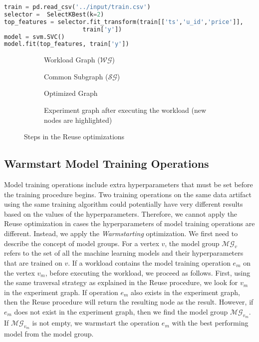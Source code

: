 \begin{lstlisting}[language=Python, firstnumber = 8,caption=New workload script (Imports are omitted),captionpos=b,label = {listing-reuse}]
train = pd.read_csv('../input/train.csv') 
selector =  SelectKBest(k=2)
top_features = selector.fit_transform(train[['ts','u_id','price']], 
				      train['y'])
model = svm.SVC()
model.fit(top_features, train['y'])
\end{lstlisting}

\begin{figure}
\captionsetup[subfigure]{justification=centering}
\begin{subfigure}[t]{0.33\linewidth}
\centering

\caption{Workload Graph ($\mathcal{WG}$)}
\end{subfigure}%
\begin{subfigure}[t]{0.33\linewidth}
\centering

\caption{Common Subgraph ($\mathcal{SG}$)}
\end{subfigure}%
\begin{subfigure}[t]{0.33\linewidth}
\centering

\caption{Optimized Graph}
\end{subfigure}
\begin{subfigure}[t]{\linewidth}
\centering

\caption{Experiment graph after executing the workload (new nodes are highlighted)}
\end{subfigure}
\caption{Steps in the Reuse optimizations}
\label{fig-reuse}
\end{figure}

\subsection{Warmstart Model Training Operations}
Model training operations include extra hyperparameters that must be set before the training procedure begins.
Two training operations on the same data artifact using the same training algorithm could potentially have very different results based on the values of the hyperparameters.
Therefore, we cannot apply the Reuse optimization in cases the hyperparameters of model training operations are different.
Instead, we apply the \textit{Warmstarting} optimization.
We first need to describe the concept of model groups.
For a vertex $v$, the model group $\mathcal{MG}_v$ refers to the set of all the machine learning models and their hyperparameters that are trained on $v$.
If a workload contains the model training operation $e_{m}$ on the vertex $v_{m}$, before executing the workload, we proceed as follows.
First, using the same traversal strategy as explained in the Reuse procedure, we look for $v_{m}$ in the experiment graph.
If operation $e_{m}$ also exists in the experiment graph, then the Reuse procedure will return the resulting node as the result.
However, if $e_{m}$ does not exist in the experiment graph, then we find the model group $\mathcal{MG}_{v_m}$.
If $\mathcal{MG}_{v_m}$ is not empty, we warmstart the operation $e_{m}$ with the best performing model from the model group.

